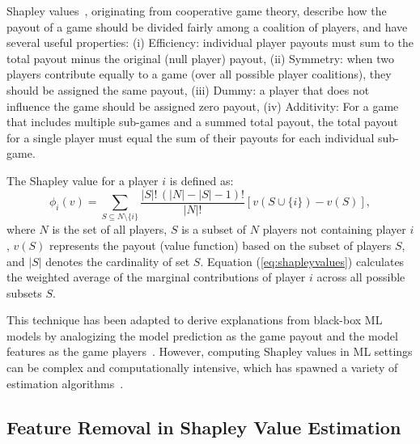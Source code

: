 Shapley values~\cite{shapley1953value}, originating from cooperative game theory, describe how the payout of a game should be divided fairly among a coalition of players, and have several useful properties:
(i) Efficiency: individual player payouts must sum to the total payout minus the original (null player) payout,
(ii) Symmetry: when two players contribute equally to a game (over all possible player coalitions), they should be assigned the same payout,
(iii) Dummy: a player that does not influence the game should be assigned zero payout,
(iv) Additivity: For a game that includes multiple sub-games and a summed total payout, the total payout for a single player must equal the sum of their payouts for each individual sub-game.

The Shapley value for a player \( i \) is defined as:
\begin{equation}
\phi_i(v) = \sum_{S \subseteq N \setminus \{i\}} \frac{|S|! \, (|N| - |S| - 1)!}{|N|!} \left[ v(S \cup \{i\}) - v(S) \right],
\label{eq:shapleyvalues}
\end{equation}
where \( N \) is the set of all players, \( S \) is a subset of \( N \) players not containing player \( i \), \( v(S) \) represents the payout (value function) based on the subset of players \( S \), and \( |S| \) denotes the cardinality of set \( S \). Equation (\ref{eq:shapleyvalues}) calculates the weighted average of the marginal contributions of player \( i \) across all possible subsets \( S \). 

This technique has been adapted to derive explanations from black-box ML models by analogizing the model prediction as the game payout and the model features as the game players~\cite{strumbelj2014, lundberg2017unified}. However, computing Shapley values in ML settings can be complex and computationally intensive, which has spawned a variety of estimation algorithms~\cite{chen2023algorithms}.

\subsection{Feature Removal in Shapley Value Estimation}


